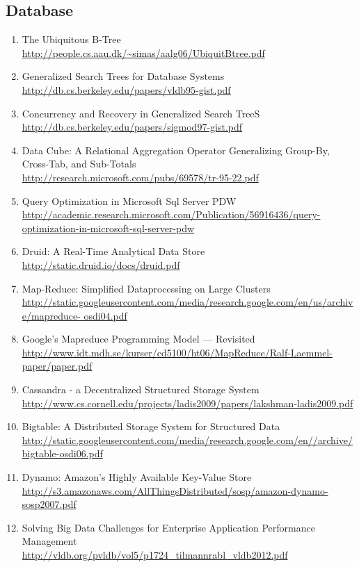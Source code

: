 \documentclass{article}
\begin{document}
\subsection{Database}
\begin{enumerate}
	\item {The Ubiquitous B-Tree\\
\url{http://people.cs.aau.dk/~simas/aalg06/UbiquitBtree.pdf}}
	\item {Generalized Search Trees for Database Systems\\
\url{http://db.cs.berkeley.edu/papers/vldb95-gist.pdf}}
	\item {Concurrency and Recovery in Generalized Search TreeS\\
\url{http://db.cs.berkeley.edu/papers/sigmod97-gist.pdf}}

	\item {Data Cube: A Relational Aggregation Operator Generalizing Group-By, Cross-Tab, and Sub-Totals\\
	\url{http://research.microsoft.com/pubs/69578/tr-95-22.pdf}}
	\item {Query Optimization in Microsoft Sql Server PDW\\
\href{http://academic.research.microsoft.com/Publication/56916436/query-optimization-in-microsoft-sql-server-pdw}{http://academic.research.microsoft.com/Publication/56916436/query-optimization-in-microsoft-sql-server-pdw}}
	\item {Druid: A Real-Time Analytical Data Store
\url{http://static.druid.io/docs/druid.pdf}}
	\item {Map-Reduce: Simplified Dataprocessing on Large Clusters\\
\url{http://static.googleusercontent.com/media/research.google.com/en/us/archive/mapreduce-
	osdi04.pdf}}
	\item {Google’s Mapreduce Programming Model — Revisited\\
\url{http://www.idt.mdh.se/kurser/cd5100/ht06/MapReduce/Ralf-Laemmel-paper/paper.pdf}}
	\item {Cassandra - a Decentralized Structured Storage System\\
\url{http://www.cs.cornell.edu/projects/ladis2009/papers/lakshman-ladis2009.pdf}}
	\item {Bigtable: A Distributed Storage System for Structured Data\\
\url{http://static.googleusercontent.com/media/research.google.com/en//archive/bigtable-osdi06.pdf}}
	\item {Dynamo: Amazon’s Highly Available Key-Value Store\\
\url{http://s3.amazonaws.com/AllThingsDistributed/sosp/amazon-dynamo-sosp2007.pdf}}
	\item {Solving Big Data Challenges for Enterprise Application Performance Management\\
\url{http://vldb.org/pvldb/vol5/p1724_tilmannrabl_vldb2012.pdf}}
\end{enumerate}
\end{document}
